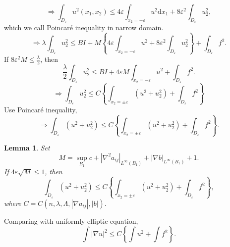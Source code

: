 \documentclass[12pt]{article}
\newtheorem{lemma}{Lemma}
\begin{document}
\[ \Rightarrow \int_{D_\varepsilon} u^2(x_1, x_2) \le 4\varepsilon \int_{x_2=-\varepsilon}u^2\mathrm{d}x_1+8\varepsilon^2\int_{D_\varepsilon}u^2_2, \]
which we call Poincar\'{e} inequality in narrow domain.
\[ \Rightarrow \lambda \int_{D_\varepsilon} u^2_2 \le BI + M\left\{ 4\varepsilon\int_{x_2=-\varepsilon}u^2+8\varepsilon^2\int_{D_\varepsilon}u^2_2 \right\}+\int_{D_\varepsilon}f^2. \]
If $ 8\varepsilon^2M\le\frac{\lambda}{2} $, then
\[ \frac{\lambda}{2}\int_{D_\varepsilon} u^2_2 \le BI + 4\varepsilon M\int_{x_2=-\varepsilon}u^2 + \int_{D_\varepsilon}f^2. \]
\[ \Rightarrow \int_{D_\varepsilon}u^2_2 \le C\left\{ \int_{x_2=\pm\varepsilon}\left(u^2+u^2_2\right)+\int_{D_\varepsilon}f^2 \right\} \]
Use Poincar\'{e} inequality,
\[ \Rightarrow\int_{D_\varepsilon}(u^2+u^2_2)\le C\left\{ \int_{x_2=\pm\varepsilon}\left(u^2+u^2_2\right)+\int_{D_\varepsilon}f^2 \right\}. \]

\begin{lemma}
Set
\[ M = \sup_{B_1} c + \left|\nabla^2 a_{ij}\right|_{L^\infty(B_1)} + |\nabla b|_{L^\infty(B_1)} + 1.\]
If $ 4\varepsilon \sqrt{M}\le1 $, then
\[ \int_{D_\varepsilon} (u^2+u^2_2)\le C\left\{ \int_{x_2=\pm\varepsilon}(u^2+u^2_2)+\int_{D_\varepsilon}f^2 \right\}, \]
where $ C=C(n, \lambda, \Lambda, |\nabla a_{ij}|, |b|). $
\end{lemma}
Comparing with uniformly elliptic equation,
\[ \int |\nabla u|^2 \le C\left\{ \int u^2 + \int f^2 \right\}. \]
\end{document}
